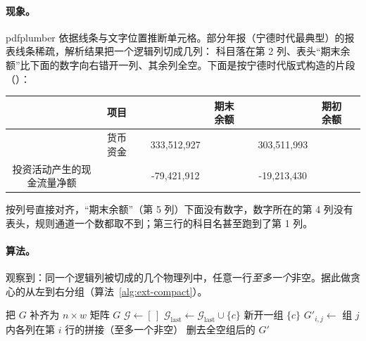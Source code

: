 \paragraph{现象。}
pdfplumber 依据线条与文字位置推断单元格。部分年报（宁德时代最典型）的报表线条稀疏，解析结果把一个逻辑列切成几列：
科目落在第 2 列、表头“期末余额”比下面的数字向右错开一列、其余列全空。下面是按宁德时代版式构造的片段（）：

\begin{center}
\scriptsize
\begin{tabular}{|c|c|c|c|c|c|c|c|c|}
\hline
 & 项目 & & & 期末余额 & & & 期初余额 & \\ \hline
 & 货币资金 & & 333,512,927 & & & 303,511,993 & & \\ \hline
投资活动产生的现金流量净额 & & & -79,421,912 & & & -19,213,430 & & \\ \hline
\end{tabular}
\end{center}

按列号直接对齐，“期末余额”（第 5 列）下面没有数字，数字所在的第 4 列没有表头，规则通道一个数都取不到；第三行的科目名甚至跑到了第 1 列。

\paragraph{算法。}
观察到：同一个逻辑列被切成的几个物理列中，任意一行\emph{至多一个}非空。据此做贪心的从左到右分组（算法~\ref{alg:ext-compact}）。

\begin{algorithm}[t]
\caption{稀疏列合并 }
\label{alg:ext-compact}
\begin{algorithmic}[1]
  \State 把 $G$ 补齐为 $n\times w$ 矩阵
   \Return $G$  \EndIf
  \State $\mathcal{G}\gets[\,]$
      \State $\mathcal{G}_{\text{last}}\gets\mathcal{G}_{\text{last}}\cup\{c\}$ 
    \Else
      \State 新开一组 $\{c\}$
    \EndIf
  \EndFor
  \State $G'_{i,j}\gets$ 组 $j$ 内各列在第 $i$ 行的拼接（至多一个非空）
  \State \Return 删去全空组后的 $G'$
\EndFunction
\end{algorithmic}
\end{algorithm}


